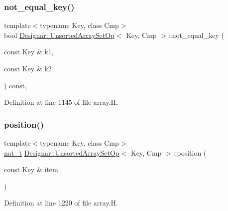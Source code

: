 \subsubsection{\texorpdfstring{not\+\_\+equal\+\_\+key()}{not\_equal\_key()}}
{\footnotesize\ttfamily template$<$typename Key, class Cmp$>$ \\
bool \hyperlink{class_designar_1_1_unsorted_array_set_op}{Designar\+::\+Unsorted\+Array\+Set\+Op}$<$ Key, Cmp $>$\+::not\+\_\+equal\+\_\+key (\begin{DoxyParamCaption}\item[{const Key \&}]{k1,  }\item[{const Key \&}]{k2 }\end{DoxyParamCaption}) const\hspace{0.3cm}{\ttfamily [inline]}, {\ttfamily [protected]}}



Definition at line 1145 of file array.\+H.

\mbox{\label{class_designar_1_1_unsorted_array_set_op_ab2f0ef08a3d92669f793727d51de705e}} 
\subsubsection{\texorpdfstring{position()}{position()}}
{\footnotesize\ttfamily template$<$typename Key, class Cmp$>$ \\
\hyperlink{namespace_designar_aa72662848b9f4815e7bf31a7cf3e33d1}{nat\+\_\+t} \hyperlink{class_designar_1_1_unsorted_array_set_op}{Designar\+::\+Unsorted\+Array\+Set\+Op}$<$ Key, Cmp $>$\+::position (\begin{DoxyParamCaption}\item[{const Key \&}]{item }\end{DoxyParamCaption})\hspace{0.3cm}{\ttfamily [inline]}}



Definition at line 1220 of file array.\+H.

\mbox{\label{class_designar_1_1_unsorted_array_set_op_aced2517a0e708effb820f5591369a7c1}} 
